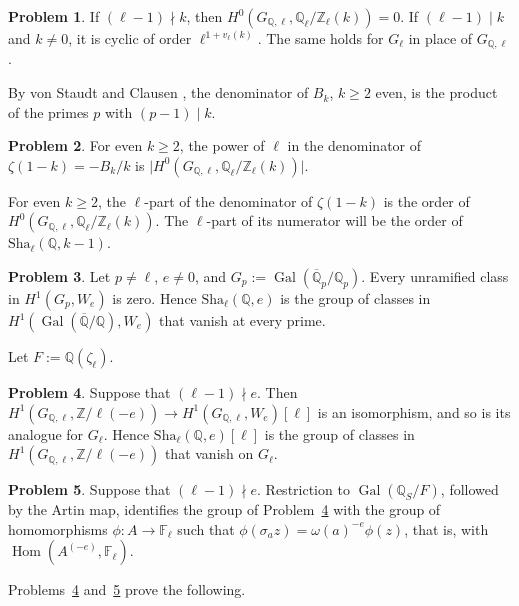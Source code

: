 \documentclass[reqno]{amsart}
\theoremstyle{definition}
\newtheorem{problem}{Problem}[section]
\theoremstyle{plain}
\theoremstyle{remark}
\newcommand{\Z}{\mathbb{Z}}
\newcommand{\Q}{\mathbb{Q}}
\newcommand{\F}{\mathbb{F}}
\newcommand{\Zl}{\Z_\ell}
\newcommand{\Ql}{\Q_\ell}
\newcommand{\Gal}{\operatorname{Gal}}
\newcommand{\Hom}{\operatorname{Hom}}
\newcommand{\Sha}{\mathrm{Sha}}
\begin{document}
\begin{problem}\label{pr:H0}
If \((\ell - 1) \nmid k\), then \(H^0(G_{\Q,\ell}, \Ql/\Zl(k)) = 0\).  If \((\ell-1) \mid k\) and \(k \ne 0\), it is cyclic of order \(\ell^{1 + v_\ell(k)}\).  The same holds for \(G_\ell\) in place of \(G_{\Q,\ell}\).
\end{problem}

By von Staudt and Clausen \cite[Thm.~5.10]{Wa}, the denominator of \(B_k\), \(k \ge 2\) even, is the product of the primes \(p\) with \((p-1) \mid k\).

\begin{problem}\label{pr:den-zeta}
For even \(k \ge 2\), the power of \(\ell\) in the denominator of \(\zeta(1-k) = -B_k/k\) is \(\lvert H^0(G_{\Q,\ell}, \Ql/\Zl(k)) \rvert\).
\end{problem}

For even \(k \ge 2\), the \(\ell\)-part of the denominator of \(\zeta(1-k)\) is the order of \(H^0(G_{\Q,\ell},\Ql/\Zl(k))\).  The \(\ell\)-part of its numerator will be the order of \(\Sha_\ell(\Q,k-1)\).

\begin{problem}\label{pr:unram-zero}
Let \(p \ne \ell\), \(e \ne 0\), and \(G_p := \Gal(\overline{\Q}_p/\Q_p)\).  Every unramified class in \(H^1(G_p, W_e)\) is zero.  Hence \(\Sha_\ell(\Q, e)\) is the group of classes in \(H^1(\Gal(\overline{\Q}/\Q), W_e)\) that vanish at every prime.
\end{problem}

Let \(F := \Q(\zeta_\ell)\).

\begin{problem}\label{pr:mod-l}
Suppose that \((\ell - 1) \nmid e\).  Then \(H^1(G_{\Q,\ell}, \Z/\ell(-e)) \to H^1(G_{\Q,\ell}, W_e)[\ell]\) is an isomorphism, and so is its analogue for \(G_\ell\).  Hence \(\Sha_\ell(\Q, e)[\ell]\) is the group of classes in \(H^1(G_{\Q,\ell}, \Z/\ell(-e))\) that vanish on \(G_\ell\).
\end{problem}

\begin{problem}\label{pr:to-classgroup}
Suppose that \((\ell - 1) \nmid e\).  Restriction to \(\Gal(\Q_S/F)\), followed by the Artin map, identifies the group of Problem~\ref{pr:mod-l} with the group of homomorphisms \(\phi \colon A \to \F_\ell\) such that \(\phi(\sigma_a z) = \omega(a)^{-e} \phi(z)\), that is, with \(\Hom(A^{(-e)}, \F_\ell)\).
\end{problem}

Problems~\ref{pr:mod-l} and~\ref{pr:to-classgroup} prove the following.
\end{document}
